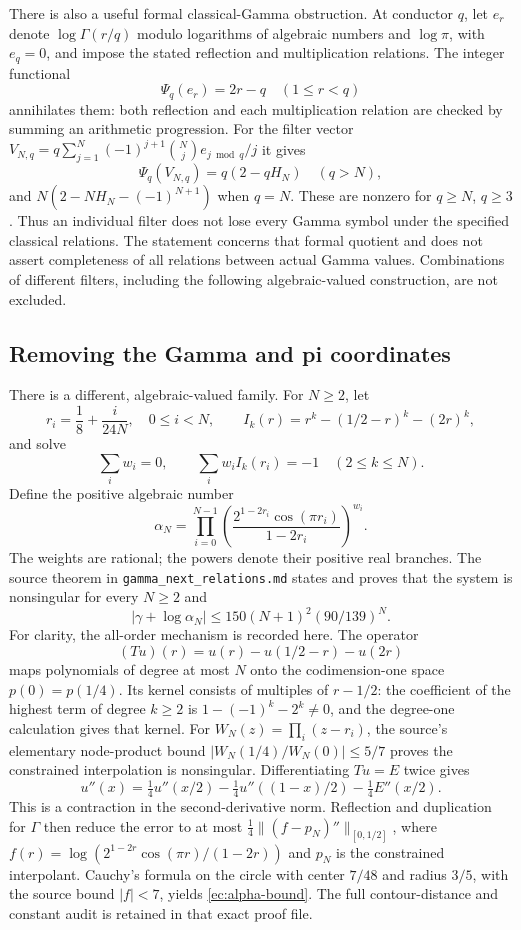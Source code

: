 \documentclass[11pt,a4paper]{article}
\theoremstyle{definition}
\theoremstyle{remark}
\numberwithin{equation}{section}
\begin{document}
There is also a useful formal classical-Gamma obstruction.  At conductor
$q$, let $e_r$ denote $\log\Gamma(r/q)$ modulo logarithms of algebraic
numbers and $\log\pi$, with $e_q=0$, and impose the stated reflection
and multiplication relations.  The integer functional
\[
 \Psi_q(e_r)=2r-q\quad(1\le r<q)
\]
annihilates them: both reflection and each multiplication relation are
checked by summing an arithmetic progression.  For the filter vector
$V_{N,q}=q\sum_{j=1}^N(-1)^{j+1}\binom Nj e_{j\bmod q}/j$ it gives
\[
 \Psi_q(V_{N,q})=q(2-qH_N)\quad(q>N),
\]
and $N(2-NH_N-(-1)^{N+1})$ when $q=N$.  These are nonzero for
$q\ge N$, $q\ge3$.  Thus an individual filter does not lose every
Gamma symbol under the specified classical relations.  The statement
concerns that formal quotient and does not assert completeness of all
relations between actual Gamma values.  Combinations of different
filters, including the following algebraic-valued construction, are not
excluded.

\subsection{Removing the Gamma and pi coordinates}
\label{ec:alpha-family}
There is a different, algebraic-valued family.  For $N\ge2$, let
\[
 r_i=\frac18+\frac{i}{24N},\quad 0\le i<N,\qquad
 I_k(r)=r^k-(1/2-r)^k-(2r)^k,
\]
and solve
\[
 \sum_iw_i=0,\qquad \sum_iw_iI_k(r_i)=-1\quad(2\le k\le N).
\]
Define the positive algebraic number
\[
 \alpha_N=\prod_{i=0}^{N-1}
 \left(\frac{2^{1-2r_i}\cos(\pi r_i)}{1-2r_i}\right)^{w_i}.
\]
The weights are rational; the powers denote their positive real branches.
The source theorem in \texttt{gamma\_next\_relations.md} states and proves
that the system is nonsingular for every $N\ge2$ and
\begin{equation}\label{ec:alpha-bound}
 |\gamma+\log\alpha_N|
 \le150(N+1)^2(90/139)^N.
\end{equation}
For clarity, the all-order mechanism is recorded here.  The operator
\[
 (Tu)(r)=u(r)-u(1/2-r)-u(2r)
\]
maps polynomials of degree at most $N$ onto the codimension-one space
$p(0)=p(1/4)$.  Its kernel consists of multiples of $r-1/2$:
the coefficient of the highest term of degree $k\ge2$ is
$1-(-1)^k-2^k\ne0$, and the degree-one calculation gives that kernel.
For $W_N(z)=\prod_i(z-r_i)$, the source's elementary node-product bound
$|W_N(1/4)/W_N(0)|\le5/7$ proves the constrained interpolation is
nonsingular.  Differentiating $Tu=E$ twice gives
\[
 u''(x)=\tfrac14u''(x/2)-\tfrac14u''((1-x)/2)
        -\tfrac14E''(x/2).
\]
This is a contraction in the second-derivative norm.  Reflection and
duplication for $\Gamma$ then reduce the error to at most
$\tfrac14\|(f-p_N)''\|_{[0,1/2]}$, where
$f(r)=\log(2^{1-2r}\cos(\pi r)/(1-2r))$ and $p_N$ is the constrained
interpolant.  Cauchy's formula on the circle with center $7/48$ and
radius $3/5$, with the source bound $|f|<7$, yields
\eqref{ec:alpha-bound}.  The full contour-distance and constant audit is
retained in that exact proof file.
\end{document}
